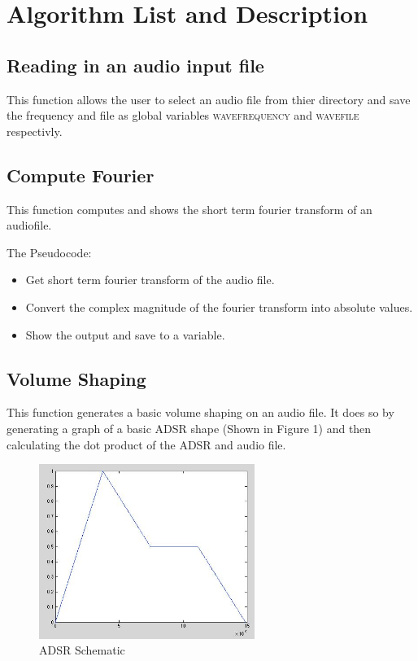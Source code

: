 \documentclass[12pt]{article}
\begin{document}
		\section{Algorithm List and Description}
			
			\subsection{Reading in an audio input file}
				 This function allows the user to select an audio file from thier directory and save the frequency and file as global variables \textsc{wavefrequency} and \textsc{wavefile} respectivly.

			\subsection{Compute Fourier}
			
				This function computes and shows the short term fourier transform of an audiofile.\newline 

				The Pseudocode:

				\begin{itemize}
  					\item Get short term fourier transform of the audio file.
    					\item Convert the complex magnitude of the fourier transform into absolute values.
      					\item Show the output and save to a variable. 
      				\end{itemize}

			\subsection{Volume Shaping}

				This function generates a basic volume shaping on an audio file. It does so by generating a graph of a basic ADSR shape (Shown in Figure 1) and then calculating the dot product of the ADSR and audio file. 

				\begin{figure}[h!]
  					\centering
            				\includegraphics[width=7cm]{VolumeShaping.png}
	      				\caption{ADSR Schematic}
				\end{figure}
\end{document}
